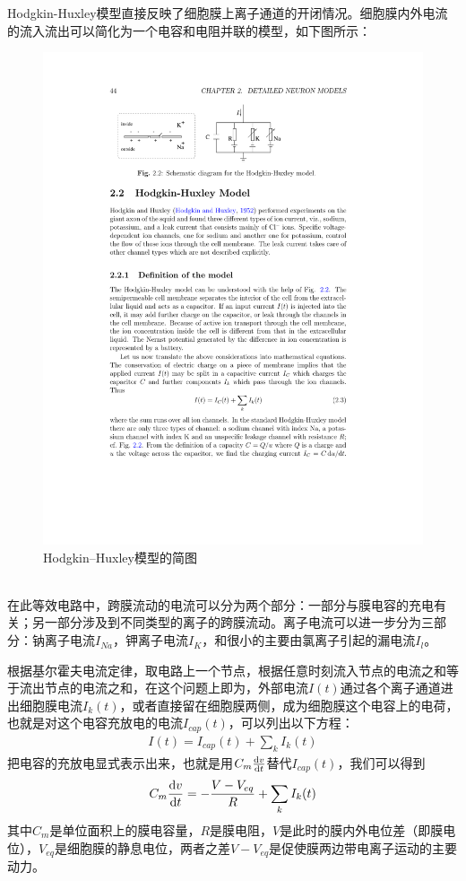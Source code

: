 \documentclass[
bachelor,
nofont, %
pdflinks,
]{xjtuthesis}
\begin{document}
Hodgkin-Huxley模型直接反映了细胞膜上离子通道的开闭情况。细胞膜内外电流的流入流出可以简化为一个电容和电阻并联的模型，如下图所示\cite{gerstner2002spiking}：
\begin{figure}[!ht]
\centering
\includegraphics[scale=1]{moxingjiantu.pdf}
\caption{Hodgkin–Huxley模型的简图}
\end{figure}\\
在此等效电路中，跨膜流动的电流可以分为两个部分：一部分与膜电容的充电有关；另一部分涉及到不同类型的离子的跨膜流动。离子电流可以进一步分为三部分：钠离子电流$I_{Na}$，钾离子电流$I_K$，和很小的主要由氯离子引起的漏电流$I_l$。

\medskip
根据基尔霍夫电流定律，取电路上一个节点，根据任意时刻流入节点的电流之和等于流出节点的电流之和，在这个问题上即为，外部电流$I(t)$通过各个离子通道进出细胞膜电流$I_{k}(t)$，或者直接留在细胞膜两侧，成为细胞膜这个电容上的电荷，也就是对这个电容充放电的电流$I_{cap}(t)$，可以列出以下方程：
\begin{align}
I(t)=I_{cap}(t)+\sum_k I_{k}(t)
\end{align}
把电容的充放电显式表示出来，也就是用$C_m\frac{\mathrm d v}{\mathrm d t}$替代$I_{cap}(t)$，我们可以得到
\begin{align}
C_m \frac{\mathrm d v}{\mathrm d t}=-\dfrac{V-V_{eq}}{R}+\sum_k I_{k}(t)
\end{align}
其中$C_m$是单位面积上的膜电容量，$R$是膜电阻，$V$是此时的膜内外电位差（即膜电位），$V_{eq}$是细胞膜的静息电位，两者之差$V-V_{eq}$是促使膜两边带电离子运动的主要动力。
\end{document}
